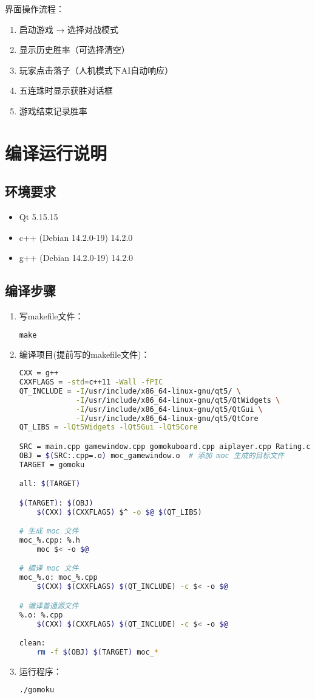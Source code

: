 \documentclass[UTF8]{ctexart}
\begin{document}
界面操作流程：
\begin{enumerate}
    \item 启动游戏 → 选择对战模式
    \item 显示历史胜率（可选择清空）
    \item 玩家点击落子（人机模式下AI自动响应）
    \item 五连珠时显示获胜对话框
    \item 游戏结束记录胜率
\end{enumerate}

\section{编译运行说明}
\subsection{环境要求}
\begin{itemize}
    \item Qt 5.15.15
    \item c++ (Debian 14.2.0-19) 14.2.0
    \item g++ (Debian 14.2.0-19) 14.2.0
\end{itemize}

\subsection{编译步骤}
\begin{enumerate}
	\item 写makefile文件：
\begin{lstlisting}[language=make]
make
\end{lstlisting}
    \item 编译项目(提前写的makefile文件)：
\begin{lstlisting}[language=bash]
CXX = g++
CXXFLAGS = -std=c++11 -Wall -fPIC
QT_INCLUDE = -I/usr/include/x86_64-linux-gnu/qt5/ \
             -I/usr/include/x86_64-linux-gnu/qt5/QtWidgets \
             -I/usr/include/x86_64-linux-gnu/qt5/QtGui \
             -I/usr/include/x86_64-linux-gnu/qt5/QtCore
QT_LIBS = -lQt5Widgets -lQt5Gui -lQt5Core

SRC = main.cpp gamewindow.cpp gomokuboard.cpp aiplayer.cpp Rating.cpp
OBJ = $(SRC:.cpp=.o) moc_gamewindow.o  # 添加 moc 生成的目标文件
TARGET = gomoku

all: $(TARGET)

$(TARGET): $(OBJ)
	$(CXX) $(CXXFLAGS) $^ -o $@ $(QT_LIBS)

# 生成 moc 文件
moc_%.cpp: %.h
	moc $< -o $@

# 编译 moc 文件
moc_%.o: moc_%.cpp
	$(CXX) $(CXXFLAGS) $(QT_INCLUDE) -c $< -o $@

# 编译普通源文件
%.o: %.cpp
	$(CXX) $(CXXFLAGS) $(QT_INCLUDE) -c $< -o $@

clean:
	rm -f $(OBJ) $(TARGET) moc_*
\end{lstlisting}
    \item 运行程序：
\begin{lstlisting}[language=bash]
./gomoku
\end{lstlisting}
\end{enumerate}
\end{document}
